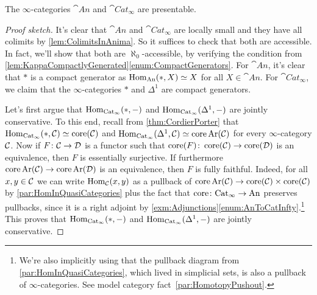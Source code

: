 \begin{cor}\label{cor:AnPresentable}
	The $\infty$-categories $\cat{An}$ and $\cat{Cat}_\infty$ are presentable.
\end{cor}
\begin{proof}[Proof sketch]
	It's clear that $\cat{An}$ and $\cat{Cat}_\infty$ are locally small and they have all colimits by \cref{lem:ColimitsInAnima}. So it suffices to check that both are accessible. In fact, we'll show that both are $\aleph_0$-accessible, by verifying the condition from \cref{lem:KappaCompactlyGenerated}\cref{enum:CompactGenerators}. For $\cat{An}$, it's clear that $*$ is a compact generator as $\operatorname{Hom}_{\mathrm{An}}(*,X)\simeq X$ for all $X\in\cat{An}$. For $\cat{Cat}_\infty$, we claim that the $\infty$-categories $*$ and $\Delta^1$ are compact generators. 
	
	Let's first argue that $\operatorname{Hom}_{\mathrm{Cat}_\infty}(*,-)$ and $\operatorname{Hom}_{\mathrm{Cat}_\infty}(\Delta^1,-)$ are jointly conservative. To this end, recall from \cref{thm:CordierPorter} that $\operatorname{Hom}_{\mathrm{Cat}_\infty}(*,\mathcal{C})\simeq \operatorname{core}(\mathcal{C})$ and $\operatorname{Hom}_{\mathrm{Cat}_\infty}(\Delta^1,\mathcal{C})\simeq \operatorname{core}\operatorname{Ar}(\mathcal{C})$ for every $\infty$-category $\mathcal{C}$. Now if $F\colon \mathcal{C}\rightarrow\mathcal{D}$ is a functor such that $\operatorname{core}(F)\colon \operatorname{core}(\mathcal{C})\rightarrow\operatorname{core}(\mathcal{D})$ is an equivalence, then $F$ is essentially surjective. If furthermore $\operatorname{core} \operatorname{Ar}(\mathcal{C})\rightarrow\operatorname{core}\operatorname{Ar}(\mathcal{D})$ is an equivalence, then $F$ is fully faithful. Indeed, for all $x,y\in\mathcal{C}$ we can write $\operatorname{Hom}_{\mathcal{C}}(x,y)$ as a pullback of $\operatorname{core}\operatorname{Ar}(\mathcal{C})\rightarrow\operatorname{core}(\mathcal{C})\times\operatorname{core}(\mathcal{C})$ by \cref{par:HomInQuasiCategories} plus the fact that $\operatorname{core}\colon \mathrm{Cat}_\infty\rightarrow\mathrm{An}$ preserves pullbacks, since it is a right adjoint by \cref{exm:Adjunctions}\cref{enum:AnToCatInfty}.\footnote{We're also implicitly using that the pullback diagram from \cref{par:HomInQuasiCategories}, which lived in simplicial sets, is also a pullback of $\infty$-categories. See model category fact~\cref{par:HomotopyPushout}.} This proves that $\operatorname{Hom}_{\mathrm{Cat}_\infty}(*,-)$ and $\operatorname{Hom}_{\mathrm{Cat}_\infty}(\Delta^1,-)$ are jointly conservative.
	

\end{proof}
